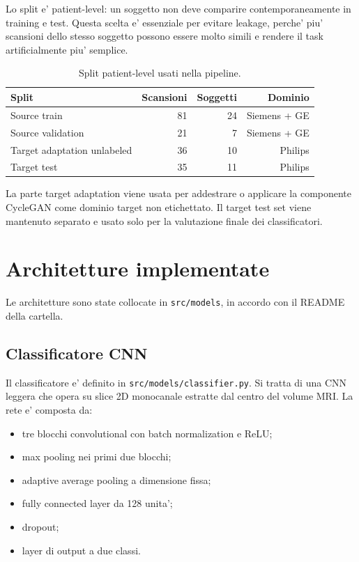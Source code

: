 \documentclass[12pt,a4paper]{article}
\begin{document}
Lo split e' patient-level: un soggetto non deve comparire contemporaneamente in training e test. Questa scelta e' essenziale per evitare leakage, perche' piu' scansioni dello stesso soggetto possono essere molto simili e rendere il task artificialmente piu' semplice.

\begin{table}[H]
\centering
\caption{Split patient-level usati nella pipeline.}
\begin{tabular}{lrrr}
\toprule
Split & Scansioni & Soggetti & Dominio \\
\midrule
Source train & 81 & 24 & Siemens + GE \\
Source validation & 21 & 7 & Siemens + GE \\
Target adaptation unlabeled & 36 & 10 & Philips \\
Target test & 35 & 11 & Philips \\
\bottomrule
\end{tabular}
\end{table}

La parte target adaptation viene usata per addestrare o applicare la componente CycleGAN come dominio target non etichettato. Il target test set viene mantenuto separato e usato solo per la valutazione finale dei classificatori.

\section{Architetture implementate}

Le architetture sono state collocate in \texttt{src/models}, in accordo con il README della cartella.

\subsection{Classificatore CNN}

Il classificatore e' definito in \texttt{src/models/classifier.py}. Si tratta di una CNN leggera che opera su slice 2D monocanale estratte dal centro del volume MRI. La rete e' composta da:

\begin{itemize}[leftmargin=1.2cm]
    \item tre blocchi convolutional con batch normalization e ReLU;
    \item max pooling nei primi due blocchi;
    \item adaptive average pooling a dimensione fissa;
    \item fully connected layer da 128 unita';
    \item dropout;
    \item layer di output a due classi.
\end{itemize}
\end{document}
